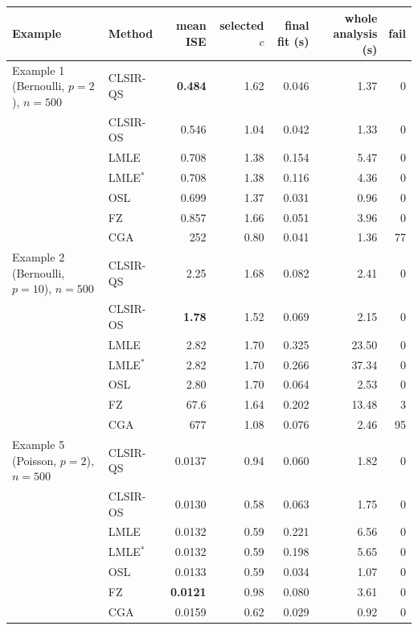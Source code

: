 \begin{tabular}{llrrrrr}
\toprule
Example & Method & mean ISE & selected $c$ & final fit (s) & whole analysis (s) & fail\\
\midrule
Example 1 (Bernoulli, $p=2$), $n=500$ & CLSIR-QS & \textbf{0.484} & 1.62 & 0.046 & 1.37 & 0\\
 & CLSIR-OS & 0.546 & 1.04 & 0.042 & 1.33 & 0\\
 & LMLE & 0.708 & 1.38 & 0.154 & 5.47 & 0\\
 & LMLE$^{\ast}$ & 0.708 & 1.38 & 0.116 & 4.36 & 0\\
 & OSL & 0.699 & 1.37 & 0.031 & 0.96 & 0\\
 & FZ & 0.857 & 1.66 & 0.051 & 3.96 & 0\\
 & CGA & 252 & 0.80 & 0.041 & 1.36 & 77\\
\addlinespace
Example 2 (Bernoulli, $p=10$), $n=500$ & CLSIR-QS & 2.25 & 1.68 & 0.082 & 2.41 & 0\\
 & CLSIR-OS & \textbf{1.78} & 1.52 & 0.069 & 2.15 & 0\\
 & LMLE & 2.82 & 1.70 & 0.325 & 23.50 & 0\\
 & LMLE$^{\ast}$ & 2.82 & 1.70 & 0.266 & 37.34 & 0\\
 & OSL & 2.80 & 1.70 & 0.064 & 2.53 & 0\\
 & FZ & 67.6 & 1.64 & 0.202 & 13.48 & 3\\
 & CGA & 677 & 1.08 & 0.076 & 2.46 & 95\\
\addlinespace
Example 5 (Poisson, $p=2$), $n=500$ & CLSIR-QS & 0.0137 & 0.94 & 0.060 & 1.82 & 0\\
 & CLSIR-OS & 0.0130 & 0.58 & 0.063 & 1.75 & 0\\
 & LMLE & 0.0132 & 0.59 & 0.221 & 6.56 & 0\\
 & LMLE$^{\ast}$ & 0.0132 & 0.59 & 0.198 & 5.65 & 0\\
 & OSL & 0.0133 & 0.59 & 0.034 & 1.07 & 0\\
 & FZ & \textbf{0.0121} & 0.98 & 0.080 & 3.61 & 0\\
 & CGA & 0.0159 & 0.62 & 0.029 & 0.92 & 0\\
\bottomrule
\end{tabular}